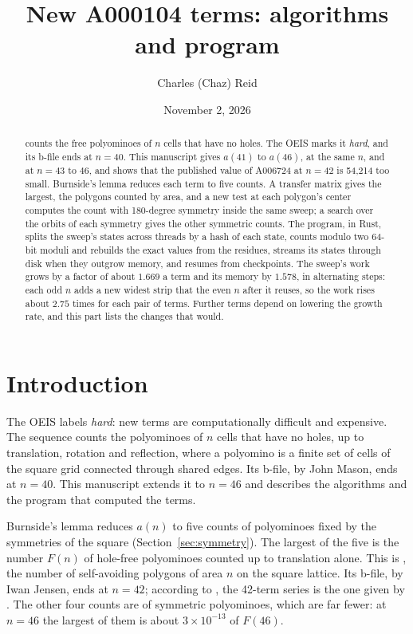 \documentclass[11pt]{a000104}
\title{New A000104 terms: algorithms and program}
\author{Charles (Chaz) Reid}
\date{November 2, 2026}
\numberwithin{equation}{section}
\begin{document}
\maketitle

\begin{abstract}
 counts the free polyominoes of $n$ cells that have no holes.
The OEIS marks it \emph{hard}, and its b-file ends at $n = 40$.
This manuscript gives $a(41)$ to $a(46)$,  at the same $n$, and  at $n = 43$ to $46$, and shows that the published value of A006724 at $n = 42$ is 54{,}214 too small.
Burnside's lemma reduces each term to five counts.
A transfer matrix gives the largest, the polygons counted by area, and a new test at each polygon's center computes the count with 180-degree symmetry inside the same sweep; a search over the orbits of each symmetry gives the other symmetric counts.
The program, in Rust, splits the sweep's states across threads by a hash of each state, counts modulo two 64-bit moduli and rebuilds the exact values from the residues, streams its states through disk when they outgrow memory, and resumes from checkpoints.
The sweep's work grows by a factor of about $1.669$ a term and its memory by $1.578$, in alternating steps: each odd $n$ adds a new widest strip that the even $n$ after it reuses, so the work rises about $2.75$ times for each pair of terms.
Further terms depend on lowering the growth rate, and this part lists the changes that would.
\end{abstract}

\section{Introduction}\label{sec:intro}

The OEIS labels  \emph{hard}: new terms are computationally difficult and expensive.
The sequence counts the polyominoes of $n$ cells that have no holes, up to translation, rotation and reflection, where a polyomino is a finite set of cells of the square grid connected through shared edges.
Its b-file, by John Mason, ends at $n = 40$.
This manuscript extends it to $n = 46$ and describes the algorithms and the program that computed the terms.

Burnside's lemma reduces $a(n)$ to five counts of polyominoes fixed by the symmetries of the square (Section~\ref{sec:symmetry}).
The largest of the five is the number $F(n)$ of hole-free polyominoes counted up to translation alone.
This is , the number of self-avoiding polygons of area $n$ on the square lattice.
Its b-file, by Iwan Jensen, ends at $n = 42$; according to \textcite[4]{JensenGuttmann:2000}, the 42-term series is the one given by \textcite{GuttmannJensenWongEnting:2000}.
The other four counts are of symmetric polyominoes, which are far fewer: at $n = 46$ the largest of them is about $3 \times 10^{-13}$ of $F(46)$.
\end{document}
